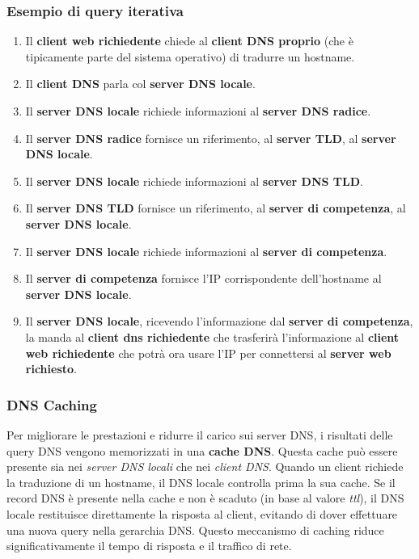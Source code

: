 \subsubsection*{Esempio di query iterativa}
\begin{enumerate}
\item Il \textbf{client web richiedente} chiede al \textbf{client DNS proprio} (che è tipicamente parte del sistema operativo) di tradurre un hostname.
\item Il \textbf{client DNS} parla col \textbf{server DNS locale}.
\item Il \textbf{server DNS locale} richiede informazioni al \textbf{server DNS radice}.
\item Il \textbf{server DNS radice} fornisce un riferimento, al \textbf{server TLD}, al \textbf{server DNS locale}.
\item Il \textbf{server DNS locale} richiede informazioni al \textbf{server DNS TLD}.
\item Il \textbf{server DNS TLD} fornisce un riferimento, al \textbf{server di competenza}, al \textbf{server DNS locale}.
\item Il \textbf{server DNS locale} richiede informazioni al \textbf{server di competenza}.
\item Il \textbf{server di competenza} fornisce l'IP corrispondente dell'hostname al \textbf{server DNS locale}.
\item Il \textbf{server DNS locale}, ricevendo l'informazione dal \textbf{server di competenza}, la manda al \textbf{client dns richiedente} che trasferirà l'informazione al \textbf{client web richiedente} che potrà ora usare l'IP per connettersi al \textbf{server web richiesto}.
\end{enumerate}

\subsubsection*{DNS Caching}
Per migliorare le prestazioni e ridurre il carico sui server DNS, i risultati delle query DNS vengono memorizzati in una \textbf{cache DNS}. Questa cache può essere presente sia nei \textit{server DNS locali} che nei \textit{client DNS}. Quando un client richiede la traduzione di un hostname, il DNS locale controlla prima la sua cache. Se il record DNS è presente nella cache e non è scaduto (in base al valore \textit{ttl}), il DNS locale restituisce direttamente la risposta al client, evitando di dover effettuare una nuova query nella gerarchia DNS. Questo meccanismo di caching riduce significativamente il tempo di risposta e il traffico di rete.

